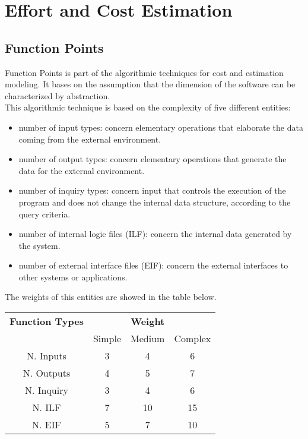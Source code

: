 \newpage
\section{Effort and Cost Estimation}

	\subsection{Function Points}
		Function Points is part of the algorithmic techniques for cost and estimation modeling. It bases on the assumption that the dimension of the software can be characterized by abstraction.\\
		This algorithmic technique is based on the complexity of five different entities: 
		\begin{itemize}
			\item number of input types: concern elementary operations that elaborate the data coming from the external environment.
			\item number of output types: concern elementary operations that generate the data for the external environment.
			\item number of inquiry types: concern input that controls the execution of the program and does not change the internal data structure, according to the query criteria.
			\item number of internal logic files (ILF): concern the internal data generated by the system.
			\item number of external interface files (EIF): concern the external interfaces to other systems or applications.
		\end{itemize}
		\vspace{0.5cm}
		The weights of this entities are showed in the table below.
		\vspace{0.9cm}
		\begin{center}
			\begin{tabular}{c c c c}
				\hline 	\textbf{Function Types} & & \textbf{Weight}  & \\[0.1cm]
				& Simple & Medium & Complex\\[0.1cm]
				\hline	N. Inputs & 3 & 4 & 6 \\[0.05cm]
				\hline	N. Outputs & 4 & 5 & 7 \\[0.05cm]
				\hline	N. Inquiry & 3 & 4 & 6 \\[0.05cm]
				\hline	N. ILF & 7 & 10 & 15 \\[0.05cm]
				\hline	N. EIF & 5 & 7 & 10 \\[0.05cm]
				\hline
			\end{tabular}
		\end{center}
		\newpage
